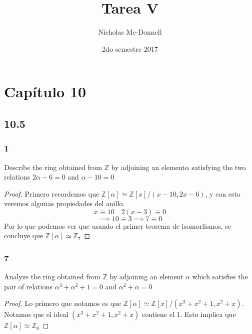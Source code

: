 \documentclass[11pt]{article}
\title{Tarea V}
\author{Nicholas Mc-Donnell}
\date{2do semestre 2017}
\newcommand{\set}[1]{\mathbb{#1}}
\theoremstyle{definition}
\begin{document}
        \maketitle
        \newpage

        \tableofcontents
        \newpage
        \section{Capítulo 10}
        \subsection{10.5}
        \subsubsection{1}
        Describe the ring obtained from $\set{Z}$ by adjoining an element$\alpha$ satisfying the two relations $2\alpha-6=0$ and $\alpha-10=0$
        \begin{proof}
            Primero recordemos que $\set{Z}[\alpha]\simeq\set{Z}[x]/(x-10,2x-6)$, y con esto veremos algunas propiedades del anillo.
            \[x\equiv 10\quad2(x-3)\equiv0\]
            \[\implies 10\equiv 3\implies 7\equiv 0\]
            Por lo que podemos ver que usando el primer teorema de isomorfismos, se concluye que $\set{Z}[\alpha]\simeq\set{Z}_7$
        \end{proof}

        \subsubsection{7}
        Analyze the ring obtained from $\set{Z}$ by adjoining an element $\alpha$ which satisfies the pair of relations $\alpha^3+\alpha^2+1=0$ and $\alpha^2+\alpha=0$
        \begin{proof}
            Lo primero que notamos es que $\set{Z}[\alpha]\simeq\set{Z}[x]/(x^3+x^2+1,x^2+x)$. Notamos que el ideal $(x^3+x^2+1,x^2+x)$ contiene el 1. Esto implica que $\set{Z}[\alpha]\simeq\set{Z}_0$
        \end{proof}
\end{document}
